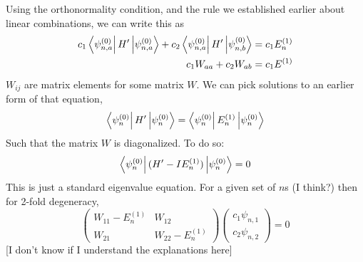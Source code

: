 \documentclass[a4paper]{article}
\begin{document}
Using the orthonormality condition, and the rule we established earlier about
linear combinations, we can write this as
\begin{align*}
	c_1\left\langle \psi_{n,a}^{(0)} \right\rvert H'\left\lvert \psi_{n,a}^{(0)}\right\rangle +
	c_2\left\langle \psi_{n,a}^{(0)} \right\rvert H'\left\lvert \psi_{n,b}^{(0)}\right\rangle &=
	c_1 E_n^{(1)}\\
	c_1W_{aa} + c_2W_{ab} &= c_1E^{(1)}
\end{align*}
$W_{ij}$ are matrix elements for some matrix $W$.
We can pick solutions to an earlier form of that equation,
\[ \left\langle \psi_n^{(0)} \right\rvert H'\left\lvert \psi_n^{(0)}\right\rangle = 
	\left\langle \psi_n^{(0)} \right\rvert E_n^{(1)}\left\lvert \psi_n^{(0)}\right\rangle 
\]
Such that the matrix $W$ is diagonalized. To do so:
\[ \left\langle \psi_n^{(0)} \right\rvert(H'-IE_n^{(1)})\left\lvert \psi_n^{(0)}\right\rangle = 0 \]
This is just a standard eigenvalue equation. For a given set of $n$s (I think?)
then for 2-fold degeneracy,
\[
	\begin{pmatrix}
		W_{11} - E_n^{(1)} & W_{12}\\
		W_{21} & W_{22} - E_n^{(1)}
	\end{pmatrix}
	\begin{pmatrix}
		c_1 \psi_{n,1}\\
		c_2 \psi_{n,2}
	\end{pmatrix}
	= 0
\]
[I don't know if I understand the explanations here]
\end{document}
